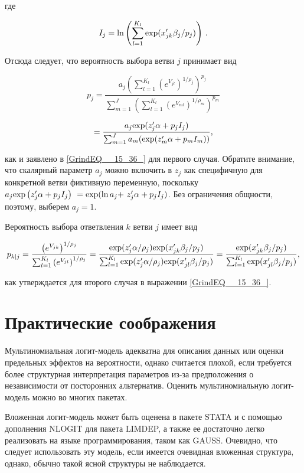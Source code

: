 где

\[I_j={\ln  \left(\sum^{K_l}_{l=1}{{\rm exp}(x'_{jk}{\beta }_j/p_j)}\right)\ }.\] 

Отсюда следует, что вероятность выбора ветви $j$ принимает вид

\[p_j=\frac{a_j{\left(\sum^{K_l}_{l=1}{{\left(e^{V_{jl}}\right)}^{{1}/{{\rho }_j}}}\right)}^{p_j}}{\sum^J_{m=1}{{\left(\sum^{K_l}_{l=1}{{\left(e^{V_{ml}}\right)}^{{1}/{{\rho }_m}}}\right)}^{p_m}}}\] 

\[=\frac{a_j{\rm exp}(z'_j\alpha +p_jI_j)}{\sum^J_{m=1}{a_m({\rm exp}(z'_m\alpha +p_mI_m))}},\] 

как и заявлено в \eqref{GrindEQ__15_36_} для первого случая. Обратите внимание, что скалярный параметр $a_j$ можно включить в $z_j$ как специфичную для конкретной ветви фиктивную переменную, поскольку $a_j{\exp  \left(z'_j\alpha +p_jI_j\right)\ }={\rm exp}({\ln  a_j+\ }z'_j\alpha +p_jI_j)$. Без ограничения общности, поэтому, выберем $a_j=1$.

Вероятность выбора ответвления $k$ ветви $j$ имеет вид

\[p_{k|j}=\frac{{\left(e^{V_{jk}}\right)}^{{1}/{{\rho }_j}}}{\sum^{K_l}_{l=1}{{\left(e^{V_{jl}}\right)}^{{1}/{{\rho }_j}}}}=\frac{{\rm exp}({z'_j\alpha }/{{\rho }_j}){\rm exp}(x'_{jk}{\beta }_j/p_j)}{\sum^{K_l}_{l=1}{{\rm exp}({z'_j\alpha }/{{\rho }_j}){\rm exp}(x'_{jl}{\beta }_j/p_j)}}=\frac{{\rm exp}(x'_{jk}{\beta }_j/p_j)}{\sum^{K_l}_{l=1}{{\rm exp}(x'_{jl}{\beta }_j/p_j)}},\] 

как утверждается для второго случая в выражении \eqref{GrindEQ__15_36_}.

\section{Практические соображения}

Мультиномиальная логит-модель адекватна для описания данных или оценки предельных эффектов на вероятности, однако считается плохой, если требуется более структурная интерпретация параметров из-за предположения о независимости от посторонних альтернатив. Оценить мультиномиальную логит-модель можно во многих пакетах.

Вложенная логит-модель может быть оценена в пакете STATA и с помощью дополнения NLOGIT для пакета LIMDEP, а также ее достаточно легко реализовать на языке программирования, таком как GAUSS. Очевидно, что следует использовать эту модель, если имеется очевидная вложенная структура, однако, обычно такой ясной структуры не наблюдается.


